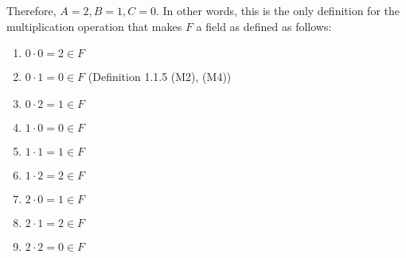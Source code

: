 \documentclass[12pt, letterpaper, oneside]{book}
\begin{document}
Therefore, $A = 2, B = 1, C = 0$. In other words, this is the only definition for the multiplication operation that
makes $F$ a field as defined as follows:
\begin{enumerate}
  \item $0 \cdot 0 = 2 \in F$
  \item $0 \cdot 1 = 0 \in F$ (Definition 1.1.5 (M2), (M4))
  \item $0 \cdot 2 = 1 \in F$
  \item $1 \cdot 0 = 0 \in F$
  \item $1 \cdot 1 = 1 \in F$
  \item $1 \cdot 2 = 2 \in F$
  \item $2 \cdot 0 = 1 \in F$
  \item $2 \cdot 1 = 2 \in F$
  \item $2 \cdot 2 = 0 \in F$
\end{enumerate}
\end{document}
